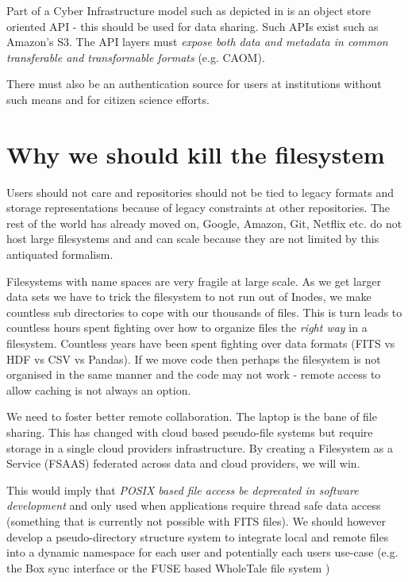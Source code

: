 Part of a Cyber Infrastructure model such as depicted in  is an object store oriented \gls{API} - this should be used for data sharing. Such APIs exist such as Amazon's S3.
The  \gls{API} layers must \emph{expose both data and \gls{metadata} in common
transferable and transformable formats} (e.g. \gls{CAOM}).


There must also be an authentication source for users at institutions without such means and for citizen science efforts.

\section{Why we should kill the filesystem}

Users should not care and repositories should not be tied to legacy formats  and storage representations because of legacy constraints  at other repositories.
The rest of the world has already moved on,  Google, Amazon, Git, Netflix etc. do not host large filesystems and and can scale because they are not limited by this antiquated formalism.

Filesystems with name spaces are very fragile at large scale. As we get larger data sets we have to trick the filesystem to not run out of Inodes, we make countless sub directories to cope with our thousands of files.
This is turn leads to countless hours spent fighting over how to organize files  the \emph{right way} in a filesystem.
Countless years have been spent fighting over data formats (\gls{FITS} vs \gls{HDF} vs \gls{CSV} vs Pandas).
If we move code then perhaps the filesystem is not organised in the same manner and the code may not work - remote access to allow caching is not always an option.

We need to foster better remote collaboration.  The laptop is the bane of file sharing.
This has changed with cloud based pseudo-file systems but require storage in a single
cloud providers infrastructure. By creating a Filesystem as a Service (\gls{FSAAS}) federated
across data and cloud providers, we will win.

This would imply that \emph{POSIX based file access be deprecated
in software development} and only used when applications require thread safe
data access (something that is currently not possible with \gls{FITS} files).
We should however  develop a pseudo-directory structure system to
integrate local and remote files into a dynamic namespace for each user and potentially
each users use-case (e.g. the Box sync interface or the \gls{FUSE} based WholeTale file system
\citep{BRINCKMAN2019854})

